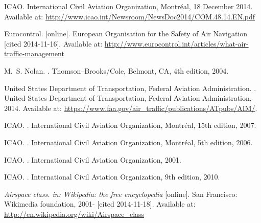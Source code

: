 
\cleardoublepage 
\begin{thebibliography}{1}

ICAO.
\newblock International Civil Aviation Organization, Montréal, 18 December 2014.
\newblock Available at: \url{http://www.icao.int/Newsroom/NewsDoc2014/COM.48.14.EN.pdf}

Eurocontrol.
 [online].
\newblock European Organisation for the Safety of Air Navigation [cited 2014-11-16].
\newblock Available at: \url{http://www.eurocontrol.int/articles/what-air-traffic-management}

M.~S. Nolan.
.
\newblock Thomson--Brooks/Cole, Belmont, CA, 4th edition, 2004.

United States Department of Transportation, Federal Aviation Administration.
.
\newblock United States Department of Transportation, Federal Aviation Administration, 2014.
\newblock Available at: \url{https://www.faa.gov/air_traffic/publications/ATpubs/AIM/}.

ICAO.
.
\newblock International Civil Aviation Organization, Montréal, 15th edition, 2007.

ICAO.
.
\newblock International Civil Aviation Organization, Montréal, 5th edition, 2006.

ICAO.
.
\newblock International Civil Aviation Organization, 2001.

ICAO.
.
\newblock International Civil Aviation Organization, 9th edition, 2010.

{\em Airspace class. in: Wikipedia: the free encyclopedia} [online].
\newblock San Francisco: Wikimedia foundation, 2001- [cited 2014-11-18].
\newblock Available at: \url{http://en.wikipedia.org/wiki/Airspace_class}


\end{thebibliography}
